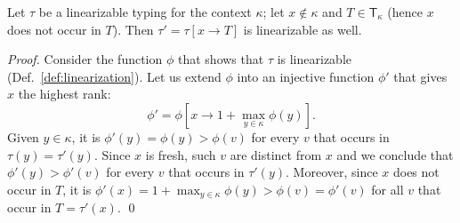 \begin{lemma}\label{lem:declare_invariant}
  Let $\tau$ be a linearizable typing for the context $\kappa$;
  let $x\not\in\kappa$ and $T\in\mathsf{T}_\kappa$ (hence $x$ does not occur in $T$).
  Then $\tau'=\tau[x\to T]$ is linearizable as well.
\end{lemma}
\begin{proof}
  Consider the function $\phi$ that shows that $\tau$ is linearizable (Def.~\ref{def:linearization}).
  Let us extend $\phi$ into an injective function $\phi'$ that gives $x$ the highest rank:
  \[
  \phi'=\phi\left[x\to 1+\max\limits_{y\in\kappa}\phi(y)\right].
  \]
  Given $y\in\kappa$, it is $\phi'(y)=\phi(y)>\phi(v)$ for every $v$ that occurs
  in $\tau(y)=\tau'(y)$. Since $x$ is fresh, such $v$ are distinct from $x$ and we
  conclude that $\phi'(y)>\phi'(v)$ for every $v$ that occurs in $\tau'(y)$.
  Moreover, since $x$ does not occur in $T$, it is
  $\phi'(x)=1+\max_{y\in\kappa}\phi(y)>\phi(v)=\phi'(v)$ for all $v$ that occur in $T=\tau'(x)$.
  \qed
\end{proof}
